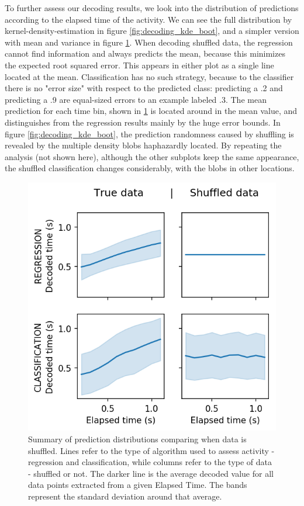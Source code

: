     To further assess our decoding results, we look into the distribution of predictions according to the elapsed time of the activity. We can see the full distribution by kernel-density-estimation in figure \ref{fig:decoding_kde_boot}, and a simpler version with mean and variance in figure \ref{fig:decoding_line_boot}. When decoding shuffled data, the regression cannot find information and always predicts the mean, because this minimizes the expected root squared error. This appears in either plot as a single line located at the mean. Classification has no such strategy, because to the classifier there is no "error size" with respect to the predicted class: predicting a .2 and predicting a .9 are equal-sized errors to an example labeled .3. The mean prediction for each time bin, shown in \ref{fig:decoding_line_boot} is located around in the mean value, and distinguishes from the regression results mainly by the huge error bounds. In figure \ref{fig:decoding_kde_boot}, the prediction randomness caused by shuffling is revealed by the multiple density blobs haphazardly located. By repeating the analysis (not shown here), although the other subplots keep the same appearance, the shuffled classification changes considerably, with the blobs in other locations.
    
    \begin{figure}[ht]
        \centering
        \includegraphics{figures/decoding_line_bootstrap_vs_true_31.png}
        \caption[Summary of prediction distributions comparing when data is shuffled]{Summary of prediction distributions comparing when data is shuffled. Lines refer to the type of algorithm used to assess activity - regression and classification, while columns refer to the type of data - shuffled or not. The darker line is the average decoded value for all data points extracted from a given Elapsed Time. The bands represent the standard deviation around that average.}
        \label{fig:decoding_line_boot}
    \end{figure}
    
